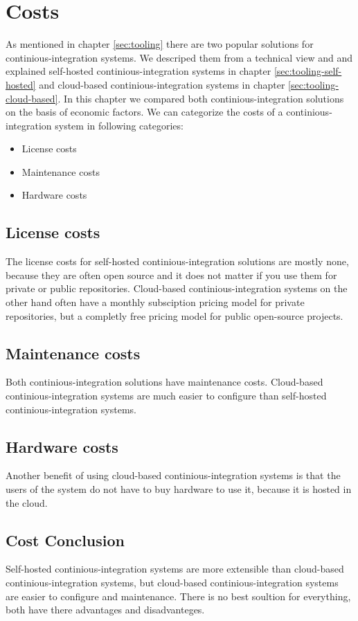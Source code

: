 \section{Costs}\label{sec:costs}

As mentioned in chapter \ref{sec:tooling} there are two popular solutions for continious-integration systems.
 We descriped them from a technical view and and explained self-hosted continious-integration systems in chapter \ref{sec:tooling-self-hosted} and cloud-based continious-integration systems in chapter \ref{sec:tooling-cloud-based}.
 In this chapter we compared both continious-integration solutions on the basis of economic factors.
 We can categorize the costs of a continious-integration system in following categories:

\begin{itemize} 
    \item License costs 

    \item Maintenance costs 

    \item Hardware costs

\end{itemize}


\subsection{License costs}

The license costs for self-hosted continious-integration solutions are mostly none, because they are often open source
and it does not matter if you use them for private or public repositories. 
Cloud-based continious-integration systems on the other hand often have a monthly subsciption
pricing model for private repositories, but a completly free pricing model for 
public open-source projects.

\subsection{Maintenance costs}

Both continious-integration solutions have maintenance costs. Cloud-based continious-integration systems are much easier to configure than self-hosted continious-integration systems.

\subsection{Hardware costs}
Another benefit of using cloud-based continious-integration systems is that the users of the system
do not have to buy hardware to use it, because it is hosted in the cloud.

\subsection{Cost Conclusion}

Self-hosted continious-integration systems are more extensible than cloud-based 
continious-integration systems, but cloud-based continious-integration 
systems are easier to configure and maintenance. There is no best soultion 
for everything, both have there advantages and disadvanteges.
